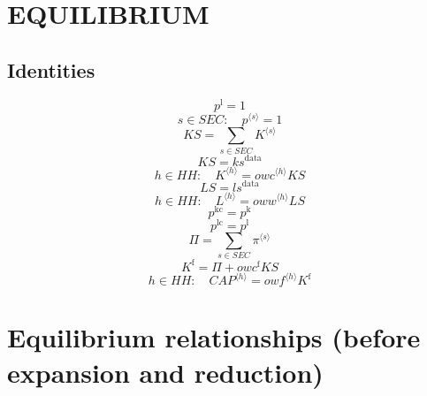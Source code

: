 \section{EQUILIBRIUM}

\subsection{Identities}

\begin{equation}
p^{\mathrm{l}} = 1
\end{equation}
\begin{equation}
s\in {S\!E\!C}\colon\quad {p}^{\langle s\rangle} = 1
\end{equation}
\begin{equation}
{K\!S} = \sum_{s\in {S\!E\!C}} {K}^{\langle s\rangle}
\end{equation}
\begin{equation}
{K\!S} = {k\!s}^{\mathrm{data}}
\end{equation}
\begin{equation}
h\in {H\!H}\colon\quad {K}^{\langle h\rangle} = {{{o\!w\!c}}^{\langle h\rangle}} {{K\!S}}
\end{equation}
\begin{equation}
{L\!S} = {l\!s}^{\mathrm{data}}
\end{equation}
\begin{equation}
h\in {H\!H}\colon\quad {L}^{\langle h\rangle} = {{{o\!w\!w}}^{\langle h\rangle}} {{L\!S}}
\end{equation}
\begin{equation}
p^{\mathrm{kc}} = p^{\mathrm{k}}
\end{equation}
\begin{equation}
p^{\mathrm{lc}} = p^{\mathrm{l}}
\end{equation}
\begin{equation}
\Pi = \sum_{s\in {S\!E\!C}} {\pi}^{\langle s\rangle}
\end{equation}
\begin{equation}
K^{\mathrm{f}} = \Pi + {{o\!w\!c}^{\mathrm{f}}} {{K\!S}}
\end{equation}
\begin{equation}
h\in {H\!H}\colon\quad {{C\!A\!P}}^{\langle h\rangle} = {{{o\!w\!f}}^{\langle h\rangle}} {K^{\mathrm{f}}}
\end{equation}




\section{Equilibrium relationships (before expansion and reduction)}

